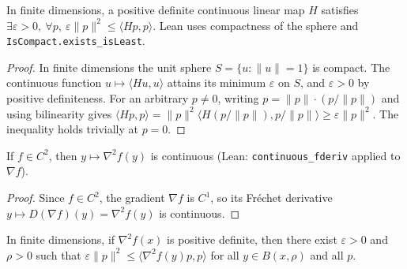\begin{lemma}\label{lem:inner_coercive_of_pd}
  \leanok{}
  \uses{}
  In finite dimensions, a positive definite continuous linear map $H$ satisfies
  $\exists \varepsilon>0,\ \forall p,\ \varepsilon\|p\|^2 \le \langle Hp,p\rangle$.
  Lean uses compactness of the sphere and \texttt{IsCompact.exists\_isLeast}.
\end{lemma}
\begin{proof}
  \leanok{}
  In finite dimensions the unit sphere $S=\{u : \|u\|=1\}$ is compact. The continuous function
  $u\mapsto \langle Hu,u\rangle$ attains its minimum $\varepsilon$ on $S$, and $\varepsilon>0$ by positive
  definiteness. For an arbitrary $p\ne 0$, writing $p = \|p\|\cdot(p/\|p\|)$ and using bilinearity
  gives $\langle Hp,p\rangle = \|p\|^2 \langle H(p/\|p\|), p/\|p\|\rangle \ge \varepsilon\|p\|^2$. The
  inequality holds trivially at $p=0$.
\end{proof}

\begin{lemma}\label{lem:continuous_hessian}
  \leanok{}
  If $f\in C^2$, then $y\mapsto \nabla^2 f(y)$ is continuous (Lean: \texttt{continuous\_fderiv} applied to $\nabla f$).
\end{lemma}
\begin{proof}
  \leanok{}
  Since $f\in C^2$, the gradient $\nabla f$ is $C^1$, so its Fr\'echet derivative $y\mapsto D(\nabla f)(y) =
  \nabla^2 f(y)$ is continuous.
\end{proof}

\begin{lemma}\label{lem:hessian_pd_local_lower_bound}
  \leanok{}
  In finite dimensions, if $\nabla^2 f(x)$ is positive definite, then there exist $\varepsilon>0$ and $\rho>0$ such that
  $\varepsilon\|p\|^2 \le \langle \nabla^2 f(y)p,p\rangle$ for all $y\in B(x,\rho)$ and all $p$.
\end{lemma}

